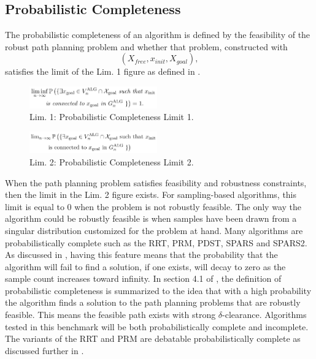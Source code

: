 \documentclass[conference]{IEEEtran} \usepackage[T1]{fontenc} \usepackage[backend=biber, style=ieee]{biblatex}
\begin{document}
\subsection{Probabilistic Completeness} \label{Probabilistic Completeness}
The probabilistic completeness of an algorithm is defined by the feasibility of the robust path planning problem and whether that problem, constructed with \[(X_{free}, x_{init}, X_{goal}),\] 
satisfies the limit of the Lim. 1 figure as defined in \cite{rrt_star}.

\begin{figure}
\label{limit_1} 
\centering 
\includegraphics[width=0.49\textwidth]{prob_compl_limit_1}
\\ Lim. 1: Probabilistic Completeness Limit 1.
\end{figure}

\begin{figure}
\label{limit_2} 
\centering 
\includegraphics[width=0.49\textwidth]{prob_compl_limit_2}
\\ Lim. 2: Probabilistic Completeness Limit 2.
\end{figure}

When the path planning problem satisfies feasibility and robustness constraints, then the limit in the Lim. 2 figure exists.
For sampling-based algorithms, this limit is equal to 0 when the problem is not robustly feasible. The only way the algorithm could be robustly feasible is when samples 
have been drawn from a singular distribution customized for the problem at hand. Many algorithms are probabilistically complete such as the RRT, PRM, PDST, SPARS and SPARS2. 
As discussed in \cite{fmt_star}, having this feature means that the probability that the algorithm will fail to find a solution, if one exists, will decay to zero as the sample 
count increases toward infinity. In section 4.1 of \cite{rrt_star}, the definition of probabilistic completeness is summarized to the idea that with a high probability the
algorithm finds a solution to the path planning problems that are robustly feasible. This means the feasible path exists with strong $\delta$-clearance. Algorithms tested in this 
benchmark will be both probabilistically complete and incomplete. The variants of the RRT and PRM are debatable probabilistically complete as discussed further in \cite{rrt_star}.
\end{document}
